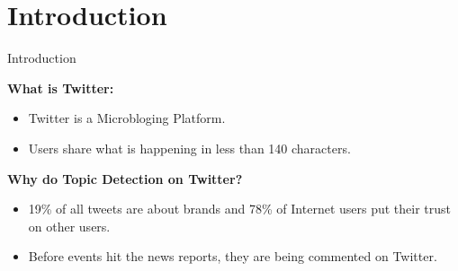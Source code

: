 \section{Introduction}
\begin{frame}{Introduction}

  \textbf{What is Twitter:}
  \begin{itemize}
    \item Twitter is a Microbloging Platform.\\
    \item Users share what is happening in less than 140
      characters.\\
  \end{itemize}

  \textbf{  Why do Topic Detection on Twitter? }
  \begin{itemize}
    \item 19\% of all tweets are about brands and 78\% of Internet users put their trust on other users.\\
    \item Before events hit the news reports, they are being commented on Twitter.
  \end{itemize}
\end{frame}


